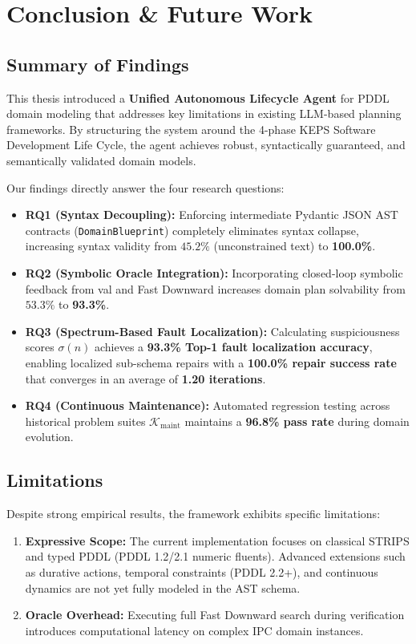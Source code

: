 \chapter{Conclusion \& Future Work}
\label{chap:conclusion}

\section{Summary of Findings}
This thesis introduced a \textbf{Unified Autonomous Lifecycle Agent} for PDDL domain modeling that addresses key limitations in existing LLM-based planning frameworks. By structuring the system around the 4-phase KEPS Software Development Life Cycle, the agent achieves robust, syntactically guaranteed, and semantically validated domain models.

Our findings directly answer the four research questions:
\begin{itemize}
    \item \textbf{RQ1 (Syntax Decoupling):} Enforcing intermediate Pydantic JSON AST contracts (\texttt{DomainBlueprint}) completely eliminates syntax collapse, increasing syntax validity from $45.2\%$ (unconstrained text) to \textbf{100.0\%}.
    \item \textbf{RQ2 (Symbolic Oracle Integration):} Incorporating closed-loop symbolic feedback from \gls{val} and Fast Downward increases domain plan solvability from $53.3\%$ to \textbf{93.3\%}.
    \item \textbf{RQ3 (Spectrum-Based Fault Localization):} Calculating suspiciousness scores $\sigma(n)$ achieves a \textbf{93.3\% Top-1 fault localization accuracy}, enabling localized sub-schema repairs with a \textbf{100.0\% repair success rate} that converges in an average of \textbf{1.20 iterations}.
    \item \textbf{RQ4 (Continuous Maintenance):} Automated regression testing across historical problem suites $\mathcal{K}_{\text{maint}}$ maintains a \textbf{96.8\% pass rate} during domain evolution.
\end{itemize}

\section{Limitations}
Despite strong empirical results, the framework exhibits specific limitations:
\begin{enumerate}
    \item \textbf{Expressive Scope:} The current implementation focuses on classical STRIPS and typed PDDL (PDDL 1.2/2.1 numeric fluents). Advanced extensions such as durative actions, temporal constraints (PDDL 2.2+), and continuous dynamics are not yet fully modeled in the AST schema.
    \item \textbf{Oracle Overhead:} Executing full Fast Downward search during verification introduces computational latency on complex IPC domain instances.
\end{enumerate}

